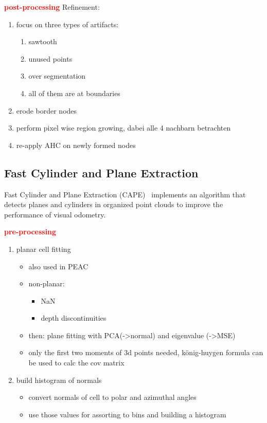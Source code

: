 \documentclass[main.tex]{subfiles}
\begin{document}
\textbf{\textcolor{red}{post-processing}}
Refinement:
\begin{enumerate}
    \item focus on three types of artifacts:
          \begin{enumerate}
              \item sawtooth
              \item unused points
              \item over segmentation
              \item all of them are at boundaries
          \end{enumerate}
    \item erode border nodes
    \item perform pixel wise region growing, dabei alle 4 nachbarn betrachten
    \item re-apply AHC on newly formed nodes
\end{enumerate}

\subsection{Fast Cylinder and Plane Extraction}
Fast Cylinder and Plane Extraction (CAPE)~\cite{Proença_Gao_2018} implements an algorithm that detects planes and cylinders in organized point clouds to improve the performance
of visual odometry.

\textbf{\textcolor{red}{pre-processing}}
\begin{enumerate}
    \item planar cell fitting
          \begin{itemize}
              \item also used in PEAC
              \item non-planar:
                    \begin{itemize}
                        \item NaN
                        \item depth discontinuities
                    \end{itemize}
              \item then: plane fitting with PCA(->normal) and eigenvalue (->MSE)
              \item only the first two moments of 3d points needed, könig-huygen formula can be used to calc the cov matrix
          \end{itemize}
    \item build histogram of normals
          \begin{itemize}
              \item convert normals of cell to polar and azimuthal angles
              \item use those values for assorting to bins and building a histogram
          \end{itemize}
\end{enumerate}
\end{document}
